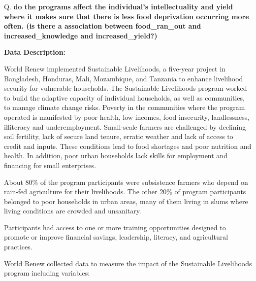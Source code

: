\documentclass[
  letterpaper,
  DIV=11,
  numbers=noendperiod]{scrartcl}
\begin{document}
Q. \textbf{do the programs affect the individual's intellectuality and
yield where it makes sure that there is less food deprivation occurring
more often. (is there a association between food\_ran\_out and
increased\_knowledge and increased\_yield?)}

\textbf{Data Description:}

World Renew implemented Sustainable Livelihoods, a five-year project in
Bangladesh, Honduras, Mali, Mozambique, and Tanzania to enhance
livelihood security for vulnerable households. The Sustainable
Livelihoods program worked to build the adaptive capacity of individual
households, as well as communities, to manage climate change risks.
Poverty in the communities where the program operated is manifested by
poor health, low incomes, food insecurity, landlessness, illiteracy and
underemployment. Small-scale farmers are challenged by declining soil
fertility, lack of secure land tenure, erratic weather and lack of
access to credit and inputs. These conditions lead to food shortages and
poor nutrition and health. In addition, poor urban households lack
skills for employment and financing for small enterprises.

About 80\% of the program participants were subsistence farmers who
depend on rain-fed agriculture for their livelihoods. The other 20\% of
program participants belonged to poor households in urban areas, many of
them living in slums where living conditions are crowded and unsanitary.

Participants had access to one or more training opportunities designed
to promote or improve financial savings, leadership, literacy, and
agricultural practices.

World Renew collected data to measure the impact of the Sustainable
Livelihoods program including variables:
\end{document}
